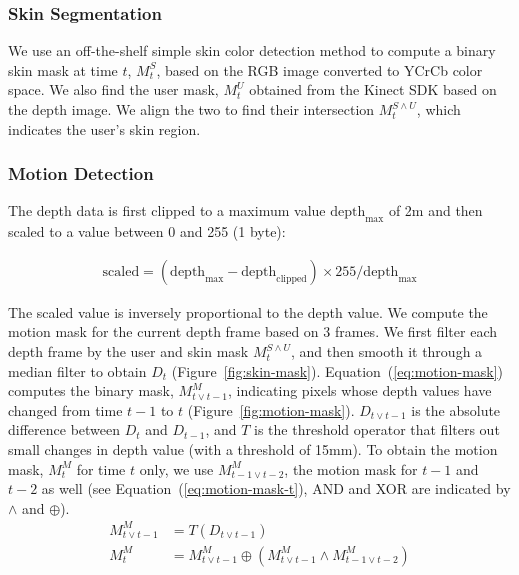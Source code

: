 \subsubsection{Skin Segmentation}
We use an off-the-shelf simple skin color detection method to compute a binary skin mask at
time $t$, $M_t^S$, based on the RGB image converted to YCrCb color space. We
also find the user mask, $M_t^U$ obtained from the Kinect SDK based on the depth image.
We align the two to find their intersection $M_t^{S\wedge U}$, which indicates the user's skin region.

\subsubsection{Motion Detection}
The depth data is first clipped to a maximum value $\text{depth}_\text{max}$ of
2m and then scaled to a value between 0 and 255 (1 byte):

\begin{align*}
\text{scaled} = (\text{depth}_\text{max} -
\text{depth}_\text{clipped}) \times 255 / \text{depth}_\text{max}
\end{align*}

The scaled value is inversely proportional to the depth value.
We compute the motion mask for the current depth frame based on 3 frames. We first filter each
depth frame by the user and skin mask $M_t^{S\wedge U}$, and then
smooth it through a median filter to obtain $D_t$ (Figure~\ref{fig:skin-mask}).
Equation~(\ref{eq:motion-mask}) computes the binary mask, $M_{t\vee t-1}^M$,
indicating pixels whose depth values have changed from time $t-1$ to $t$ (Figure~\ref{fig:motion-mask}).
$D_{t\vee t-1}$ is the absolute difference between $D_t$ and $D_{t-1}$, and $T$ is the threshold operator that filters out small changes in depth value
(with a threshold of 15mm).
To obtain the motion mask, $M_{t}^M$ for time $t$ only, we use $M_{t-1\vee t-2}^M$, the motion mask for $t-1$ and $t-2$ as well (see Equation~(\ref{eq:motion-mask-t}),
 AND and XOR are indicated by $\wedge$ and $\oplus$).
\begin{align}
M_{t\vee t-1}^M &= T(D_{t\vee t-1}) \label{eq:motion-mask} \\
M_{t}^M &= M_{t\vee t-1}^M \oplus (M_{t\vee t-1}^M \wedge M_{t-1\vee t-2}^M) \label{eq:motion-mask-t}
\end{align}

